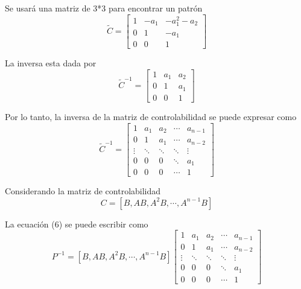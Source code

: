 Se usará una matriz de 3*3 para encontrar un patrón
\[
    \tilde{C} = 
    \begin{bmatrix}
        1 & -a_{1} & -a_{1}^{2}-a_{2} \\
        0 & 1 & -a_{1} \\
        0 & 0 & 1
    \end{bmatrix}
\]

La inversa esta dada por
\[
    \tilde{C}^{-1} = 
    \begin{bmatrix}
        1 & a_{1} & a_{2} \\
        0 & 1 & a_{1} \\
        0 & 0 & 1
    \end{bmatrix}
\]

Por lo tanto, la inversa de la matriz de controlabilidad se puede expresar como 
\[
    \tilde{C}^{-1} = 
    \begin{bmatrix}
        1 & a_{1} & a_{2} & \cdots & a_{n-1} \\
        0 & 1 & a_{1} & \cdots & a_{n-2}\\
        \vdots & \ddots & \ddots & \ddots & \vdots\\
        0 & 0 & 0 & \ddots & a_{1}\\
        0 & 0 & 0 & \cdots & 1
    \end{bmatrix}
\]

Considerando la matriz de controlabilidad 
\[
    C = [B, AB, A^{2}B, \cdots, A^{n-1}B ]
\]

La ecuación (6) se puede escribir como
\[
    P^{-1} =
    [B, AB, A^{2}B, \cdots, A^{n-1}B ]
    \begin{bmatrix}
        1 & a_{1} & a_{2} & \cdots & a_{n-1} \\
        0 & 1 & a_{1} & \cdots & a_{n-2}\\
        \vdots & \ddots & \ddots & \ddots & \vdots\\
        0 & 0 & 0 & \ddots & a_{1}\\
        0 & 0 & 0 & \cdots & 1
    \end{bmatrix}
\]